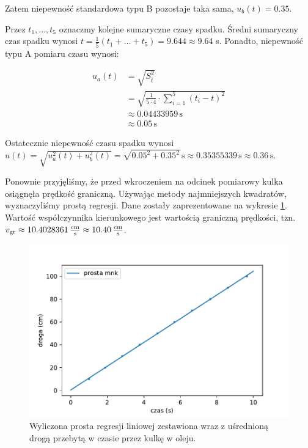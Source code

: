 \documentclass[a4paper]{article}
\begin{document}
Zatem niepewność standardowa typu B pozostaje taka sama, $u_b(t) = 0.35$.

Przez $t_1, \dots, t_5$ oznaczmy kolejne sumaryczne czasy spadku.
Średni sumaryczny czas spadku wynosi $t = \frac 1 5 (t_1 + \dots + t_5) = 9.644 \approx 9.64$ s.
Ponadto, niepewność typu A pomiaru czasu wynosi:

\begin{align*}
	u_a(t) &= \sqrt{S^{2}_{\overline{t}}} \\
	&= \sqrt{\frac{1}{5 \cdot 4} \cdot \sum_{i=1}^{5} (t_i - t)^2} \\
	&\approx 0.04433959 \, \text{s} \\
	&\approx 0.05 \, \text{s}
\end{align*}

Ostatecznie niepewność czasu spadku wynosi $u(t) = \sqrt{u_a^2(t) + u_b^2(t)} = \sqrt{0.05^2 + 0.35^2} \, \text{s} \approx 0.35355339 \, \text{s} \approx 0.36\, \text{s}$.

Ponownie przyjęliśmy, że przed wkroczeniem na odcinek pomiarowy kulka osiągnęła prędkość graniczną.
Używając metody najmniejszych kwadratów, wyznaczyliśmy prostą regresji.
Dane zostały zaprezentowane na wykresie \ref{wykres_olej}.
Wartość współczynnika kierunkowego jest wartością graniczną prędkości, tzn.
$v_{\text{gr}} \approx 10.4028361 \, \frac{\text{cm}}{\text{s}} \approx 10.40 \, \frac{\text{cm}}{\text{s}}$.

\begin{figure}[h]
\centering
\includegraphics[scale=0.7]{regresja_olej.pdf}
\caption{Wyliczona prosta regresji liniowej zestawiona wraz z uśrednioną drogą przebytą w czasie przez kulkę w oleju.}
\label{wykres_olej}
\end{figure}
\end{document}
